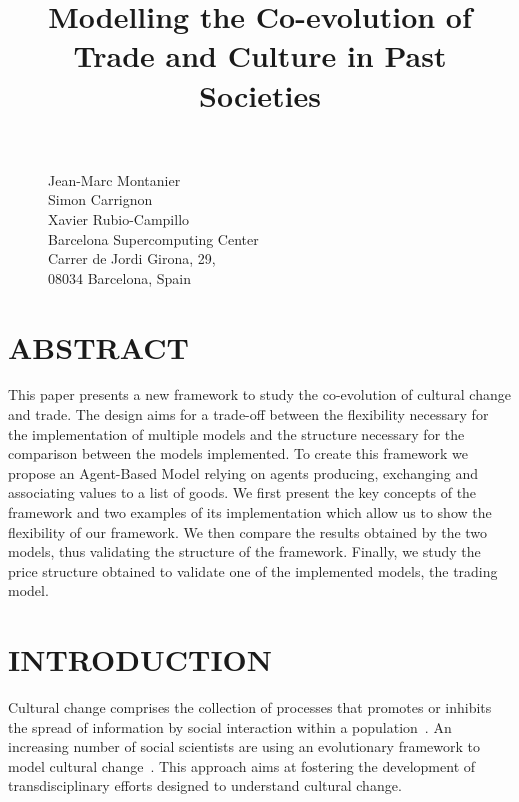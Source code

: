 \documentclass{wscpaperproc}
\begin{document}

\title{Modelling the Co-evolution of Trade and Culture in Past Societies}

\maketitle

\begin{figure}[htb]
{
\centering
Jean-Marc Montanier\\
Simon Carrignon\\ 
Xavier Rubio-Campillo\\
\vspace{12pt}
Barcelona Supercomputing Center\\
Carrer de Jordi Girona, 29, \\
08034 Barcelona, Spain\\
}
\end{figure}


\section*{ABSTRACT}

This paper presents a new framework to study the co-evolution of cultural change and trade. The design aims for a trade-off between the flexibility necessary for the implementation of multiple models and the structure necessary for the comparison between the models implemented. To create this framework we propose an Agent-Based Model relying on agents producing, exchanging and associating values to a list of goods. We first present the key concepts of the framework and two examples of its implementation which allow us to show the flexibility of our framework. We then compare the results obtained by the two models, thus validating the structure of the framework. Finally, we study the price structure obtained to validate one of the implemented models, the trading model.


\section{INTRODUCTION}\label{sec:intro}


Cultural change comprises the collection of processes that promotes or inhibits the spread of information by social interaction within a population~\cite{boyd_origin_2005}. An increasing number of social scientists are using an evolutionary framework to model cultural change~\cite{henrich_evolution_2003}. This approach aims at fostering the development of transdisciplinary efforts designed to understand cultural change.
\end{document}
